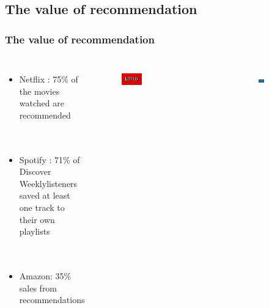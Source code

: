 \documentclass[10pt,handout,english]{beamer}
\begin{document}
		\subsection{The value of recommendation}
			\begin{frame}
				\frametitle{The value of recommendation}
				\begin{columns}[c]
						\begin{itemize}
							\item Netflix : 75\% of the movies watched are recommended\\~\\~\\
							\item Spotify :  71\% of Discover Weekly\footnotemark[2] listeners saved at least one track to their own playlists\\~\\~\\
							\item Amazon: 35\% sales from recommendations
						\end{itemize}
						\begin{figure}[h!]
				        	\centering
			            	\includegraphics[width=0.4\textwidth]{netflix.png}
			                \label{fig:netflix}
			            \end{figure}
			            \begin{figure}[h!]
				            \begin{subfigure}[b]{0.4\textwidth}
				            	\centering
				                \includegraphics[width=\textwidth]{pandora.jpg}

\end{subfigure}
\end{figure}
\end{columns}
\end{frame}
\end{document}
